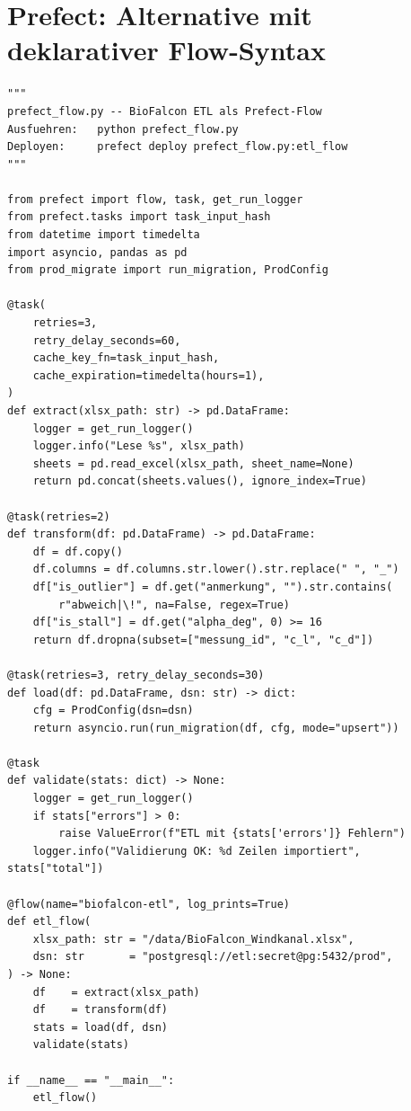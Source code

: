 \documentclass[12pt,a4paper]{report}
\theoremstyle{definition}
\theoremstyle{remark}
\begin{document}
\section{Prefect: Alternative mit deklarativer Flow-Syntax}

\begin{lstlisting}[style=python, caption={prefect\_flow.py: ETL als Prefect-Flow}, label=lst:prefect]
"""
prefect_flow.py -- BioFalcon ETL als Prefect-Flow
Ausfuehren:   python prefect_flow.py
Deployen:     prefect deploy prefect_flow.py:etl_flow
"""

from prefect import flow, task, get_run_logger
from prefect.tasks import task_input_hash
from datetime import timedelta
import asyncio, pandas as pd
from prod_migrate import run_migration, ProdConfig

@task(
    retries=3,
    retry_delay_seconds=60,
    cache_key_fn=task_input_hash,
    cache_expiration=timedelta(hours=1),
)
def extract(xlsx_path: str) -> pd.DataFrame:
    logger = get_run_logger()
    logger.info("Lese %s", xlsx_path)
    sheets = pd.read_excel(xlsx_path, sheet_name=None)
    return pd.concat(sheets.values(), ignore_index=True)

@task(retries=2)
def transform(df: pd.DataFrame) -> pd.DataFrame:
    df = df.copy()
    df.columns = df.columns.str.lower().str.replace(" ", "_")
    df["is_outlier"] = df.get("anmerkung", "").str.contains(
        r"abweich|\!", na=False, regex=True)
    df["is_stall"] = df.get("alpha_deg", 0) >= 16
    return df.dropna(subset=["messung_id", "c_l", "c_d"])

@task(retries=3, retry_delay_seconds=30)
def load(df: pd.DataFrame, dsn: str) -> dict:
    cfg = ProdConfig(dsn=dsn)
    return asyncio.run(run_migration(df, cfg, mode="upsert"))

@task
def validate(stats: dict) -> None:
    logger = get_run_logger()
    if stats["errors"] > 0:
        raise ValueError(f"ETL mit {stats['errors']} Fehlern")
    logger.info("Validierung OK: %d Zeilen importiert", stats["total"])

@flow(name="biofalcon-etl", log_prints=True)
def etl_flow(
    xlsx_path: str = "/data/BioFalcon_Windkanal.xlsx",
    dsn: str       = "postgresql://etl:secret@pg:5432/prod",
) -> None:
    df    = extract(xlsx_path)
    df    = transform(df)
    stats = load(df, dsn)
    validate(stats)

if __name__ == "__main__":
    etl_flow()
\end{lstlisting}

\end{document}
